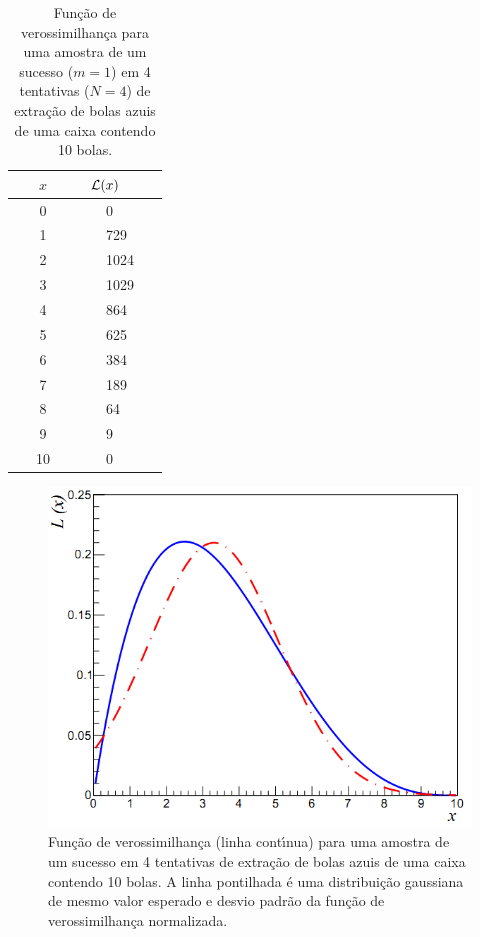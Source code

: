 \begin{table}[hbtp]
\caption{Fun\c{c}\~{a}o de verossimilhan\c{c}a para uma amostra de um  sucesso ($m=1$) em 4 tentativas ($N=4$) de extra\c{c}\~{a}o de bolas azuis de uma caixa contendo 10 bolas.}
\label{azul_vero}
\vspace{-0.3cm}
\begin{center} \small
\begin{tabular}{c|l} \hline
$~~~x~~~$ & $~~~{\cal L} (x) \quad $  \\ \hline
~~~0~~~ & ~~~0~~~ \\
~~~1~~~ & ~~~729~~~ \\
~~~2~~~ & ~~~1024~~~ \\
~~~3~~~ & ~~~1029~~~ \\
~~~4~~~ & ~~~864~~~ \\
~~~5~~~ & ~~~625~~~ \\
~~~6~~~ & ~~~384~~~ \\
~~~7~~~ & ~~~189~~~ \\
~~~8~~~ & ~~~64~~~ \\
~~~9~~~ & ~~~9~~~ \\
~~~10~~~ & ~~~0~~~ \\ \hline
\end{tabular}
\end{center}
\end{table}



\begin{figure}[htbp]
\centerline{\includegraphics[width=7.cm]{veri_l1}}
\vspace{-0.2cm}
\caption{Fun\c{c}\~{a}o de verossimilhan\c{c}a (linha cont\'{\i}nua) para uma amostra de um sucesso em 4 tentativas  de extra\c{c}\~{a}o de bolas azuis de uma caixa contendo  10 bolas. A linha pontilhada \'{e} uma distribui\c{c}\~{a}o  gaussiana de mesmo valor esperado e desvio padr\~{a}o da fun\c{c}\~{a}o de verossimilhan\c{c}a normalizada.}
\label{azul_vero_fig}
\end{figure}


